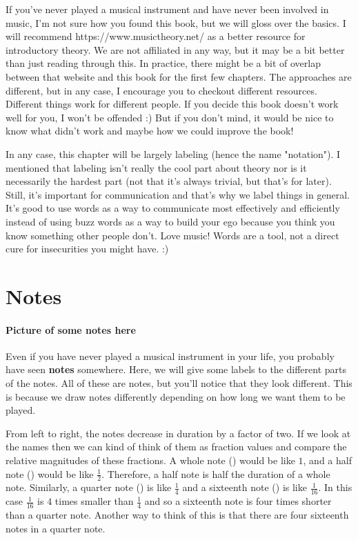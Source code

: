 \documentclass[../OpenAppliedMusicTheory.tex]{subfiles}
\begin{document}
    

    If you've never played a musical instrument and have never been involved in music, I'm not sure how you found this book, but we will gloss over the basics. I will recommend https://www.musictheory.net/ as a better resource for introductory theory. We are not affiliated in any way, but it may be a bit better than just reading through this. In practice, there might be a bit of overlap between that website and this book for the first few chapters. The approaches are different, but in any case, I encourage you to checkout different resources. Different things work for different people. If you decide this book doesn't work well for you, I won't be offended :) But if you don't mind, it would be nice to know what didn't work and maybe how we could improve the book!

    In any case, this chapter will be largely labeling (hence the name "notation"). I mentioned that labeling isn't really the cool part about theory nor is it necessarily the hardest part (not that it's always trivial, but that's for later). Still, it's important for communication and that's why we label things in general. It's good to use words as a way to communicate most effectively and efficiently instead of using buzz words as a way to build your ego because you think you know something other people don't. Love music! Words are a tool, not a direct cure for insecurities you might have. :)

    \section{Notes}\label{ch1:notes}
        \paragraph{Picture of some notes here}

        Even if you have never played a musical instrument in your life, you probably have seen \textbf{notes} somewhere. Here, we will give some labels to the different parts of the notes. All of these are notes, but you'll notice that they look different. This is because we draw notes differently depending on how long we want them to be played. 

        From left to right, the notes decrease in duration by a factor of two. If we look at the names then we can kind of think of them as fraction values and compare the relative magnitudes of these fractions. A whole note (\musWhole) would be like $1$, and a half note (\musHalf) would be like $\frac{1}{2}$. Therefore, a half note is half the duration of a whole note. Similarly, a quarter note (\musQuarter) is like $\frac{1}{4}$ and a sixteenth note (\musSixteenth) is like $\frac{1}{16}$. In this case $\frac{1}{16}$ is $4$ times smaller than $\frac{1}{4}$ and so a sixteenth note is four times shorter than a quarter note. Another way to think of this is that there are four sixteenth notes in a quarter note.
\end{document}
